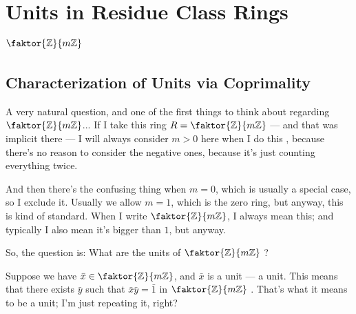 \begin{hidden}
\end{hidden}

\section{Units in Residue Class Rings \texorpdfstring{$\faktor{\mathbb{Z}}{m\mathbb{Z}}$}{Z/mZ}}

\subsection{Characterization of Units via Coprimality}

\begin{speech}[00:30:47 - 00:32:27]
A very natural question, and one of the first things to think about regarding $\faktor{\mathbb{Z}}{m\mathbb{Z}}$... If I take this ring $R = \faktor{\mathbb{Z}}{m\mathbb{Z}}$  --- and that was implicit there --- I will always consider $m > 0$ here when I do this , because there's no reason to consider the negative ones, because it's just counting everything twice.

And then there's the confusing thing when $m = 0$, which is usually a special case, so I exclude it. Usually we allow $m = 1$, which is the zero ring, but anyway, this is kind of standard. When I write $\faktor{\mathbb{Z}}{m\mathbb{Z}}$, I always mean this; and typically I also mean it's bigger than $1$, but anyway.

So, the question is: What are the units of $\faktor{\mathbb{Z}}{m\mathbb{Z}}$ ?

Suppose we have $\bar{x} \in \faktor{\mathbb{Z}}{m\mathbb{Z}}$, and $\bar{x}$ is a unit  --- a unit. This means that there exists $\bar{y}$ such that $\bar{x}\bar{y} = \bar{1}$ in $\faktor{\mathbb{Z}}{m\mathbb{Z}}$ . That's what it means to be a unit; I'm just repeating it, right?
\end{speech}

